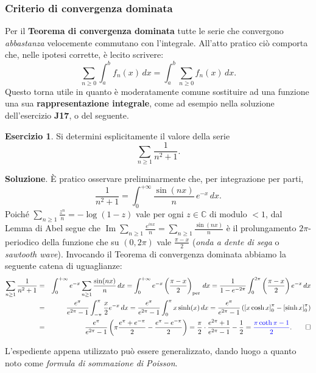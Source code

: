 \documentclass[a4paper,twoside]{article}
\newcommand{\C}{\mathbb{C}}
\theoremstyle{definition}
\newtheorem{ex}[theorem]{Esercizio}
\numberwithin{theorem}{section}
\begin{document}
\subsubsection{Criterio di convergenza dominata}

Per il \textbf{Teorema di convergenza dominata} tutte le serie che convergono \emph{abbastanza} velocemente commutano con l'integrale. All'atto pratico ciò comporta che, nelle ipotesi corrette, è lecito scrivere:
$$\sum_{n\geq 0}^{}\int_{a}^{b}f_n(x)\,dx =\int_{a}^{b}\sum_{n\geq 0} f_n(x)\, dx.$$ 
Questo torna utile in quanto è moderatamente comune sostituire ad una funzione una sua \textbf{rappresentazione integrale}, come ad esempio nella soluzione dell'esercizio \textbf{J17}, o del seguente.

\begin{ex} Si determini esplicitamente il valore della serie 
$$ \sum_{n\geq 1}\frac{1}{n^2+1}. $$
 
\end{ex}
\textbf{Soluzione}. È pratico osservare preliminarmente che, per integrazione per parti,
$$ \frac{1}{n^2+1} = \int_{0}^{+\infty}\frac{\sin(nx)}{n}\,e^{-x}\,dx.$$
Poiché $\sum_{n\geq 1}\frac{z^n}{n}=-\log(1-z)$ vale per ogni $z\in\C$ di modulo $<1$, dal Lemma di Abel segue che $\operatorname{Im}\sum_{n\geq 1}\frac{e^{inx}}{n}=\sum_{n\geq 1}\frac{\sin(nx)}{n}$ è il prolungamento $2\pi$-periodico della funzione che su $(0,2\pi)$ vale $\frac{\pi-x}{2}$ (\emph{onda a dente di sega} o \emph{sawtooth wave}). Invocando il Teorema di convergenza dominata abbiamo la seguente catena di uguaglianze:
\begin{eqnarray*}
 \sum_{n\geq 1}\frac{1}{n^2+1}&=&\int_{0}^{+\infty}e^{-x}\sum_{n\geq 1}\frac{\sin(nx)}{n}\,dx = \int_{0}^{+\infty}e^{-x}\left(\frac{\pi-x}{2}\right)_{\text{per}}\,dx = \frac{1}{1-e^{-2\pi}}\int_{0}^{2\pi}\left(\frac{\pi-x}{2}\right)e^{-x}\,dx \\
 &=& \frac{e^{\pi}}{e^{2\pi}-1}\int_{-\pi}^{\pi}\frac{x}{2}e^{-x}\,dx = \frac{e^{\pi}}{e^{2\pi}-1}\int_{0}^{\pi}x\sinh(x)\,dx = \frac{e^\pi}{e^{2\pi}-1}\left(\left[x\cosh x\right]_{0}^{\pi}-\left[\sinh x\right]_{0}^{\pi}\right)\\
 &=& \frac{e^\pi}{e^{2\pi}-1}\left(\pi\frac{e^\pi+e^{-\pi}}{2}-\frac{e^\pi-e^{-\pi}}{2}\right) = \frac{\pi}{2}\cdot \frac{e^{2\pi}+1}{e^{2\pi}-1}-\frac{1}{2}={\color{blue}\frac{\pi\coth\pi-1}{2}}.\qed
\end{eqnarray*}

L'espediente appena utilizzato può essere generalizzato, dando luogo a quanto noto come \emph{formula di sommazione di Poisson}.
\end{document}
